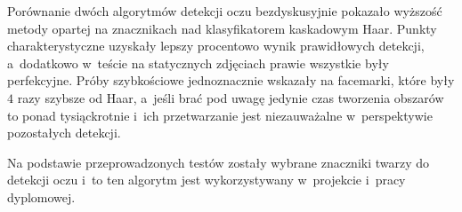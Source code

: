 Porównanie dwóch algorytmów detekcji oczu bezdyskusyjnie pokazało wyższość metody opartej na znacznikach nad klasyfikatorem kaskadowym Haar. Punkty charakterystyczne uzyskały lepszy procentowo wynik prawidłowych detekcji, a~dodatkowo w~teście na statycznych zdjęciach prawie wszystkie były perfekcyjne. Próby szybkościowe jednoznacznie wskazały na facemarki, które były $4$ razy szybsze od Haar, a~jeśli brać pod uwagę jedynie czas tworzenia obszarów to ponad tysiąckrotnie i~ich przetwarzanie jest niezauważalne w~perspektywie pozostałych detekcji.

\vspace{5mm}

Na podstawie przeprowadzonych testów zostały wybrane znaczniki twarzy do detekcji oczu i~to ten algorytm jest wykorzystywany w~projekcie i~pracy dyplomowej.